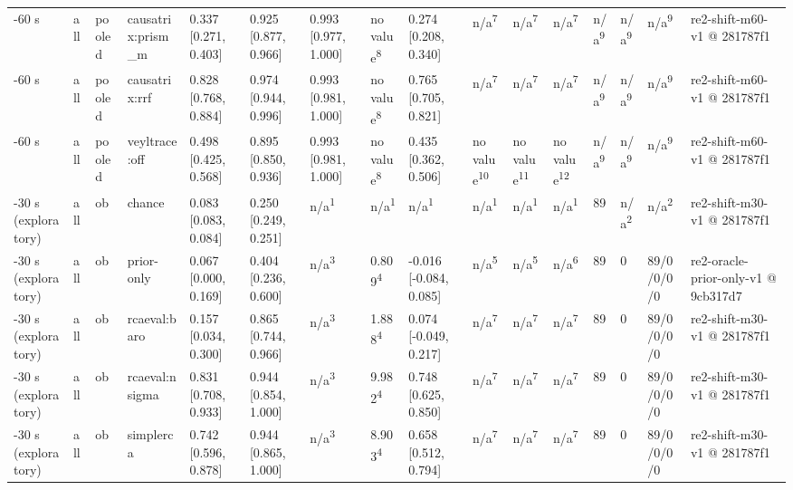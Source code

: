 \begin{table}[t]
\begin{tabular}{llllllllllllllll}
-60 s & all & pooled & causatrix:prism\_m & 0.337 [0.271, 0.403] & 0.925 [0.877, 0.966] & 0.993 [0.977, 1.000] & no value\textsuperscript{8} & 0.274 [0.208, 0.340] & n/a\textsuperscript{7} & n/a\textsuperscript{7} & n/a\textsuperscript{7} & n/a\textsuperscript{9} & n/a\textsuperscript{9} & n/a\textsuperscript{9} & re2-shift-m60-v1 @ 281787f1 \\
-60 s & all & pooled & causatrix:rrf & 0.828 [0.768, 0.884] & 0.974 [0.944, 0.996] & 0.993 [0.981, 1.000] & no value\textsuperscript{8} & 0.765 [0.705, 0.821] & n/a\textsuperscript{7} & n/a\textsuperscript{7} & n/a\textsuperscript{7} & n/a\textsuperscript{9} & n/a\textsuperscript{9} & n/a\textsuperscript{9} & re2-shift-m60-v1 @ 281787f1 \\
-60 s & all & pooled & veyltrace:off & 0.498 [0.425, 0.568] & 0.895 [0.850, 0.936] & 0.993 [0.981, 1.000] & no value\textsuperscript{8} & 0.435 [0.362, 0.506] & no value\textsuperscript{10} & no value\textsuperscript{11} & no value\textsuperscript{12} & n/a\textsuperscript{9} & n/a\textsuperscript{9} & n/a\textsuperscript{9} & re2-shift-m60-v1 @ 281787f1 \\
-30 s (exploratory) & all & ob & chance & 0.083 [0.083, 0.084] & 0.250 [0.249, 0.251] & n/a\textsuperscript{1} & n/a\textsuperscript{1} & n/a\textsuperscript{1} & n/a\textsuperscript{1} & n/a\textsuperscript{1} & n/a\textsuperscript{1} & 89 & n/a\textsuperscript{2} & n/a\textsuperscript{2} & re2-shift-m30-v1 @ 281787f1 \\
-30 s (exploratory) & all & ob & prior-only & 0.067 [0.000, 0.169] & 0.404 [0.236, 0.600] & n/a\textsuperscript{3} & 0.809\textsuperscript{4} & -0.016 [-0.084, 0.085] & n/a\textsuperscript{5} & n/a\textsuperscript{5} & n/a\textsuperscript{6} & 89 & 0 & 89/0/0/0/0 & re2-oracle-prior-only-v1 @ 9cb317d7 \\
-30 s (exploratory) & all & ob & rcaeval:baro & 0.157 [0.034, 0.300] & 0.865 [0.744, 0.966] & n/a\textsuperscript{3} & 1.888\textsuperscript{4} & 0.074 [-0.049, 0.217] & n/a\textsuperscript{7} & n/a\textsuperscript{7} & n/a\textsuperscript{7} & 89 & 0 & 89/0/0/0/0 & re2-shift-m30-v1 @ 281787f1 \\
-30 s (exploratory) & all & ob & rcaeval:nsigma & 0.831 [0.708, 0.933] & 0.944 [0.854, 1.000] & n/a\textsuperscript{3} & 9.982\textsuperscript{4} & 0.748 [0.625, 0.850] & n/a\textsuperscript{7} & n/a\textsuperscript{7} & n/a\textsuperscript{7} & 89 & 0 & 89/0/0/0/0 & re2-shift-m30-v1 @ 281787f1 \\
-30 s (exploratory) & all & ob & simplerca & 0.742 [0.596, 0.878] & 0.944 [0.865, 1.000] & n/a\textsuperscript{3} & 8.903\textsuperscript{4} & 0.658 [0.512, 0.794] & n/a\textsuperscript{7} & n/a\textsuperscript{7} & n/a\textsuperscript{7} & 89 & 0 & 89/0/0/0/0 & re2-shift-m30-v1 @ 281787f1 \\

\end{tabular}
\end{table}
